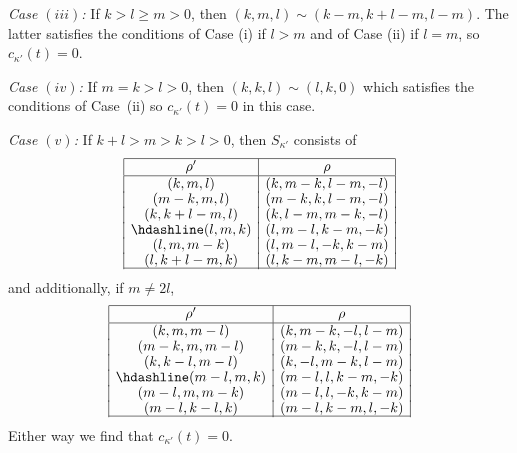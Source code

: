 \documentclass[pdftex]{sigma}
\theoremstyle{definition}
\begin{document}
{\em Case $(iii)$:} If $k>l\ge m>0$, then $(k,m,l)\sim (k-m,k+l-m,l-m)$.
The latter satisfies the conditions of Case (i) if $l>m$ and of Case (ii) if $l=m$,
so $c_{\kappa'}(t)=0$.

{\em Case $(iv)$:} If $m=k>l>0$, then $(k,k,l)\sim (l,k,0)$ which satisfies
the conditions of Case~(ii) so $c_{\kappa'}(t)=0$ in this case.

{\em Case $(v)$:}
If $k+l>m>k>l>0$, then $S_{\kappa'}$ consists of
\[\begin{array}{|c|c|}
\hline
\rho' & \rho \\ \hline
(k,m,l) & (k,m-k,l-m,-l)\\[-1.0pt]
(m-k,m,l) & (m-k,k,l-m,-l) \\[-1.0pt]
(k,k+l-m,l) & (k,l-m,m-k,-l) \\[-1.0pt] \hdashline
(l,m,k) & (l,m-l,k-m,-k)\\[-1.0pt]
(l,m,m-k) & (l,m-l,-k,k-m) \\[-1.0pt]
(l,k+l-m,k) & (l,k-m,m-l,-k)\\[-1.0pt]
\hline
\end{array}
\]
and additionally, if $m\ne 2l$,{\samepage
\[\begin{array}{|c|c|}
\hline
\rho' & \rho \\ \hline
(k,m,m-l)& (k,m-k,-l,l-m) \\[-1.0pt]
(m-k,m,m-l)& (m-k,k,-l,l-m) \\[-1.0pt]
(k,k-l,m-l)& (k,-l,m-k,l-m) \\[-1.0pt] \hdashline

(m-l,m,k)& (m-l,l,k-m,-k) \\[-1.0pt]
(m-l,m,m-k)& (m-l,l,-k,k-m) \\[-1.0pt]
(m-l,k-l,k)& (m-l,k-m,l,-k) \\[-1.0pt]
\hline
\end{array}
\]
Either way we find that $c_{\kappa'}(t)=0$.}
\end{document}
